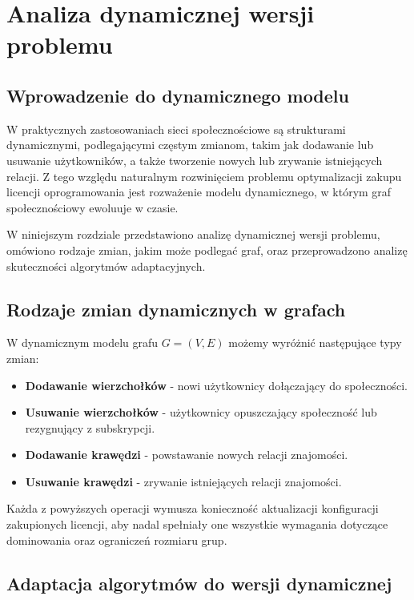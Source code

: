 \chapter{Analiza dynamicznej wersji problemu}

\section{Wprowadzenie do dynamicznego modelu}

W praktycznych zastosowaniach sieci społecznościowe są strukturami dynamicznymi, podlegającymi częstym zmianom, takim jak dodawanie lub usuwanie użytkowników, a także tworzenie nowych lub zrywanie istniejących relacji. Z tego względu naturalnym rozwinięciem problemu optymalizacji zakupu licencji oprogramowania jest rozważenie modelu dynamicznego, w którym graf społecznościowy ewoluuje w czasie.

W niniejszym rozdziale przedstawiono analizę dynamicznej wersji problemu, omówiono rodzaje zmian, jakim może podlegać graf, oraz przeprowadzono analizę skuteczności algorytmów adaptacyjnych.

\section{Rodzaje zmian dynamicznych w grafach}

W dynamicznym modelu grafu \(G = (V, E)\) możemy wyróżnić następujące typy zmian:

\begin{itemize}
    \item \textbf{Dodawanie wierzchołków} - nowi użytkownicy dołączający do społeczności.
    \item \textbf{Usuwanie wierzchołków} - użytkownicy opuszczający społeczność lub rezygnujący z subskrypcji.
    \item \textbf{Dodawanie krawędzi} - powstawanie nowych relacji znajomości.
    \item \textbf{Usuwanie krawędzi} - zrywanie istniejących relacji znajomości.
\end{itemize}

Każda z powyższych operacji wymusza konieczność aktualizacji konfiguracji zakupionych licencji, aby nadal spełniały one wszystkie wymagania dotyczące dominowania oraz ograniczeń rozmiaru grup.

\section{Adaptacja algorytmów do wersji dynamicznej}

